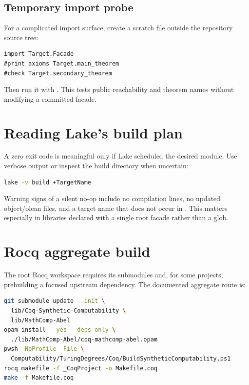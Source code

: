 \documentclass[
  10pt,
  a4paper,
  twoside,
  open=any,
  parskip=half,
  headings=big
]{scrreprt}
\newcommand{\code}[1]{\texttt{\detokenize{#1}}}
\begin{document}
\subsection{Temporary import probe}

For a complicated import surface, create a scratch file outside the repository source tree:

\begin{lstlisting}
import Target.Facade
#print axioms Target.main_theorem
#check Target.secondary_theorem
\end{lstlisting}

Then run it with \code{lake env lean}. This tests public reachability and theorem names without modifying a committed facade.

\section{Reading Lake's build plan}

A zero exit code is meaningful only if Lake scheduled the desired module. Use verbose output or inspect the build directory when uncertain:

\begin{lstlisting}[language=bash]
lake -v build +TargetName
\end{lstlisting}

Warning signs of a silent no-op include no compilation lines, no updated object/olean files, and a target name that does not occur in \code{lakefile.toml}. This matters especially in libraries declared with a single root facade rather than a glob.

\section{Rocq aggregate build}

The root Rocq workspace requires its submodules and, for some projects, prebuilding a focused upstream dependency. The documented aggregate route is:

\begin{lstlisting}[language=bash]
git submodule update --init \
  lib/Coq-Synthetic-Computability \
  lib/MathComp-Abel
opam install --yes --deps-only \
  ./lib/MathComp-Abel/coq-mathcomp-abel.opam
pwsh -NoProfile -File \
  Computability/TuringDegrees/Coq/BuildSyntheticComputability.ps1
rocq makefile -f _CoqProject -o Makefile.coq
make -f Makefile.coq
\end{lstlisting}
\end{document}
